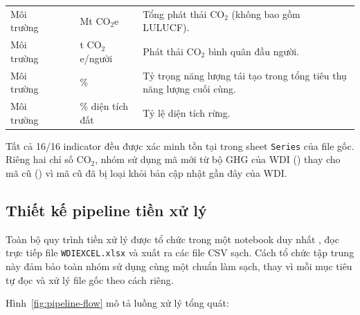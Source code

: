 \begin{longtable}{L{2.2cm}L{3cm}L{3.5cm}L{1.3cm}L{3.5cm}}
Môi trường &  &  & Mt CO$_2$e & Tổng phát thải CO$_2$ (không bao gồm LULUCF). \\
Môi trường &  &  & t CO$_2$e/người & Phát thải CO$_2$ bình quân đầu người. \\
Môi trường &  &  & \% & Tỷ trọng năng lượng tái tạo trong tổng tiêu thụ năng lượng cuối cùng. \\
Môi trường &  &  & \% diện tích đất & Tỷ lệ diện tích rừng. \\
\bottomrule
\end{longtable}

Tất cả 16/16 indicator đều được xác minh tồn tại trong sheet \texttt{Series} của file gốc. Riêng hai chỉ số CO$_2$, nhóm sử dụng mã mới từ bộ GHG của WDI () thay cho mã cũ () vì mã cũ đã bị loại khỏi bản cập nhật gần đây của WDI.

\subsection{Thiết kế pipeline tiền xử lý}

Toàn bộ quy trình tiền xử lý được tổ chức trong một notebook duy nhất , đọc trực tiếp file \texttt{WDIEXCEL.xlsx} và xuất ra các file CSV sạch. Cách tổ chức tập trung này đảm bảo toàn nhóm sử dụng cùng một chuẩn làm sạch, thay vì mỗi mục tiêu tự đọc và xử lý file gốc theo cách riêng.

Hình~\ref{fig:pipeline-flow} mô tả luồng xử lý tổng quát:

